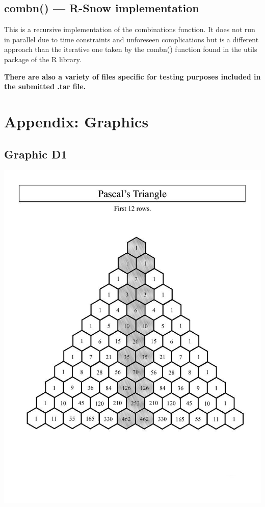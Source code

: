 \documentclass[titlepage, 11pt]{article}
\begin{document}
\subsection{combn() --- R-Snow implementation}

This is a recursive implementation of the combinations function. It does not run in parallel due to time constraints and unforeseen complications but is a different approach than the iterative one taken by the combn() function found in the utils package of the R library.

\textbf{There are also a variety of files specific for testing purposes included in the submitted .tar file.}

\section{Appendix: Graphics}
\subsection{Graphic D1}
\begin{center}
\includegraphics[scale = 0.4]{images/pascals-triangle-vert.jpg} \\
\end{center}
\end{document}
